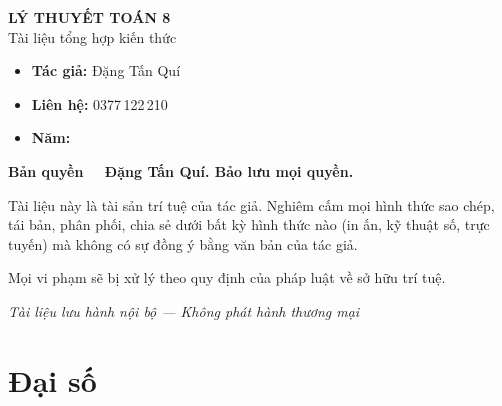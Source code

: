 \documentclass[12pt,a4paper]{article}
\begin{document}
\newpage

\thispagestyle{empty}
\vspace*{5cm}
\begin{center}
  {\Large\bfseries LÝ THUYẾT TOÁN 8}\\[8pt]
  {\large Tài liệu tổng hợp kiến thức}
\end{center}

\vspace{2cm}

\begin{tcolorbox}[
  enhanced, colback=red!3!white, colframe=red!60!black,
  fonttitle=\bfseries, title={Thông tin bản quyền},
  boxrule=1.5pt
]
  \begin{itemize}[leftmargin=*]
    \item \textbf{Tác giả:} Đặng Tấn Quí
    \item \textbf{Liên hệ:} 0377\,122\,210
    \item \textbf{Năm:} \the\year
  \end{itemize}

  \vspace{8pt}
  \textbf{Bản quyền \textcopyright\ \the\year\ Đặng Tấn Quí. Bảo lưu mọi quyền.}

  \vspace{6pt}
  Tài liệu này là tài sản trí tuệ của tác giả. Nghiêm cấm mọi hình thức sao chép, tái bản, phân phối, chia sẻ dưới bất kỳ hình thức nào (in ấn, kỹ thuật số, trực tuyến) mà không có sự đồng ý bằng văn bản của tác giả.

  \vspace{6pt}
  Mọi vi phạm sẽ bị xử lý theo quy định của pháp luật về sở hữu trí tuệ.
\end{tcolorbox}

\vfill
\begin{center}
  \small\textit{Tài liệu lưu hành nội bộ --- Không phát hành thương mại}
\end{center}

\newpage

\tableofcontents
\newpage

\section{Đại số}
\end{document}
